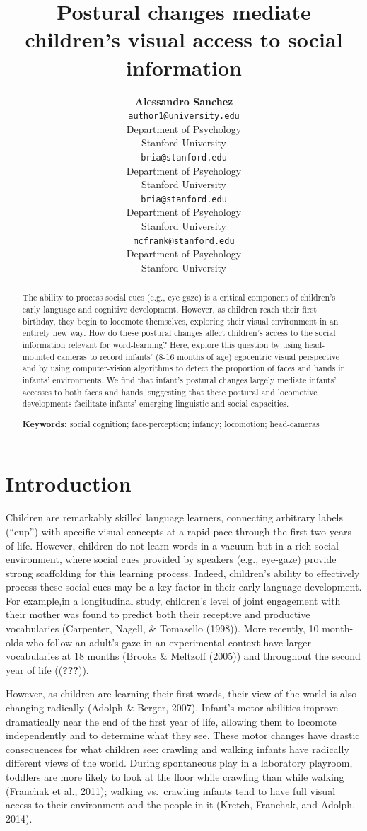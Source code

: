 \documentclass[10pt, letterpaper]{article}
\title{Postural changes mediate children's visual access to social information}
\author{{\large \bf Alessandro Sanchez} \\ \texttt{author1@university.edu} \\ Department of Psychology \\ Stanford University \And {\large \bf Bria Long} \\ \texttt{bria@stanford.edu} \\ Department of Psychology \\ Stanford University
    \And {\large \bf Ally Kraus} \\ \texttt{bria@stanford.edu} \\ Department of Psychology \\ Stanford University
    \And {\large \bf Michael C. Frank} \\ \texttt{mcfrank@stanford.edu} \\ Department of Psychology \\ Stanford University}
\begin{document}
\maketitle

\begin{abstract}
The ability to process social cues (e.g., eye gaze) is a critical
component of children's early language and cognitive development.
However, as children reach their first birthday, they begin to locomote
themselves, exploring their visual environment in an entirely new way.
How do these postural changes affect children's access to the social
information relevant for word-learning? Here, explore this question by
using head-mounted cameras to record infants' (8-16 months of age)
egocentric visual perspective and by using computer-vision algorithms to
detect the proportion of faces and hands in infants' environments. We
find that infant's postural changes largely mediate infants' accesses to
both faces and hands, suggesting that these postural and locomotive
developments facilitate infants' emerging linguistic and social
capacities.

\textbf{Keywords:}
social cognition; face-perception; infancy; locomotion; head-cameras
\end{abstract}

\section{Introduction}\label{introduction}

Children are remarkably skilled language learners, connecting arbitrary
labels (``cup'') with specific visual concepts at a rapid pace through
the first two years of life. However, children do not learn words in a
vacuum but in a rich social environment, where social cues provided by
speakers (e.g., eye-gaze) provide strong scaffolding for this learning
process. Indeed, children's ability to effectively process these social
cues may be a key factor in their early language development. For
example,in a longitudinal study, children's level of joint engagement
with their mother was found to predict both their receptive and
productive vocabularies (Carpenter, Nagell, \& Tomasello (1998)). More
recently, 10 month-olds who follow an adult's gaze in an experimental
context have larger vocabularies at 18 months (Brooks \& Meltzoff
(2005)) and throughout the second year of life (({\textbf{???}})).

However, as children are learning their first words, their view of the
world is also changing radically (Adolph \& Berger, 2007). Infant's
motor abilities improve dramatically near the end of the first year of
life, allowing them to locomote independently and to determine what they
see. These motor changes have drastic consequences for what children
see: crawling and walking infants have radically different views of the
world. During spontaneous play in a laboratory playroom, toddlers are
more likely to look at the floor while crawling than while walking
(Franchak et al., 2011); walking vs.~crawling infants tend to have full
visual access to their environment and the people in it (Kretch,
Franchak, and Adolph, 2014).
\end{document}
